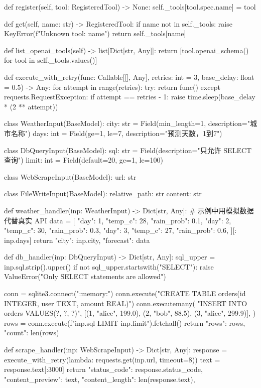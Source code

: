 \begin{codeblock}
    def register(self, tool: RegisteredTool) -> None:
        self._tools[tool.spec.name] = tool

    def get(self, name: str) -> RegisteredTool:
        if name not in self._tools:
            raise KeyError(f"Unknown tool: {name}")
        return self._tools[name]

    def list_openai_tools(self) -> list[Dict[str, Any]]:
        return [tool.openai_schema() for tool in self._tools.values()]


def execute_with_retry(func: Callable[[], Any], retries: int = 3, base_delay: float = 0.5) -> Any:
    for attempt in range(retries):
        try:
            return func()
        except requests.RequestException:
            if attempt == retries - 1:
                raise
            time.sleep(base_delay * (2 ** attempt))


class WeatherInput(BaseModel):
    city: str = Field(min_length=1, description="城市名称")
    days: int = Field(ge=1, le=7, description="预测天数，1到7")


class DbQueryInput(BaseModel):
    sql: str = Field(description="只允许 SELECT 查询")
    limit: int = Field(default=20, ge=1, le=100)


class WebScrapeInput(BaseModel):
    url: str


class FileWriteInput(BaseModel):
    relative_path: str
    content: str


def weather_handler(inp: WeatherInput) -> Dict[str, Any]:
    # 示例中用模拟数据代替真实 API
    data = [
        {"day": 1, "temp_c": 28, "rain_prob": 0.1},
        {"day": 2, "temp_c": 30, "rain_prob": 0.3},
        {"day": 3, "temp_c": 27, "rain_prob": 0.6},
    ][: inp.days]
    return {"city": inp.city, "forecast": data}


def db_handler(inp: DbQueryInput) -> Dict[str, Any]:
    sql_upper = inp.sql.strip().upper()
    if not sql_upper.startswith("SELECT"):
        raise ValueError("Only SELECT statements are allowed")

    conn = sqlite3.connect(":memory:")
    conn.execute("CREATE TABLE orders(id INTEGER, user TEXT, amount REAL)")
    conn.executemany(
        "INSERT INTO orders VALUES(?, ?, ?)",
        [(1, "alice", 199.0), (2, "bob", 88.5), (3, "alice", 299.9)],
    )
    rows = conn.execute(f"{inp.sql} LIMIT {inp.limit}").fetchall()
    return {"rows": rows, "count": len(rows)}


def scrape_handler(inp: WebScrapeInput) -> Dict[str, Any]:
    response = execute_with_retry(lambda: requests.get(inp.url, timeout=8))
    text = response.text[:3000]
    return {
        "status_code": response.status_code,
        "content_preview": text,
        "content_length": len(response.text),
    }



\end{codeblock}
